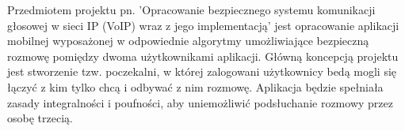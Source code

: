\tab Przedmiotem projektu pn. 'Opracowanie bezpiecznego systemu komunikacji głosowej w sieci IP (VoIP) wraz z jego implementacją' jest opracowanie aplikacji mobilnej wyposażonej w odpowiednie algorytmy umożliwiające bezpieczną rozmowę pomiędzy dwoma użytkownikami aplikacji. Główną koncepcją projektu jest stworzenie tzw. poczekalni, w której zalogowani użytkownicy bedą mogli się łączyć z kim tylko chcą i odbywać z nim rozmowę. Aplikacja będzie spełniała zasady integralności i poufności, aby uniemożliwić podsłuchanie rozmowy przez osobę trzecią.
